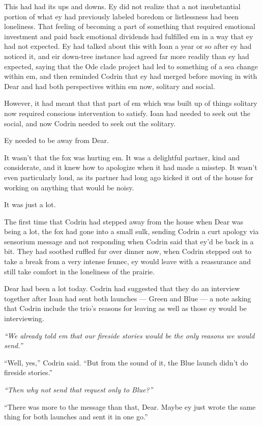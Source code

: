This had had its ups and downs. Ey did not realize that a not insubstantial portion of what ey had previously labeled boredom or listlessness had been loneliness. That feeling of becoming a part of something that required emotional investment and paid back emotional dividends had fulfilled em in a way that ey had not expected. Ey had talked about this with Ioan a year or so after ey had noticed it, and eir down-tree instance had agreed far more readily than ey had expected, saying that the Ode clade project had led to something of a sea change within em, and then reminded Codrin that ey had merged before moving in with Dear and had both perspectives within em now, solitary and social.

However, it had meant that that part of em which was built up of things solitary now required conscious intervention to satisfy. Ioan had needed to seek out the social, and now Codrin needed to seek out the solitary.

Ey needed to be away from Dear.

It wasn't that the fox was hurting em. It was a delightful partner, kind and considerate, and it knew how to apologize when it had made a misstep. It wasn't even particularly loud, as its partner had long ago kicked it out of the house for working on anything that would be noisy.

It was just a lot.

The first time that Codrin had stepped away from the house when Dear was being a lot, the fox had gone into a small sulk, sending Codrin a curt apology via sensorium message and not responding when Codrin said that ey'd be back in a bit. They had soothed ruffled fur over dinner now, when Codrin stepped out to take a break from a very intense fennec, ey would leave with a reassurance and still take comfort in the loneliness of the prairie.

Dear had been a lot today. Codrin had suggested that they do an interview together after Ioan had sent both launches — Green and Blue — a note asking that Codrin include the trio's reasons for leaving as well as those ey would be interviewing.

\emph{``We already told em that our fireside stories would be the only reasons we would send.''}

``Well, yes,'' Codrin said. ``But from the sound of it, the Blue launch didn't do fireside stories.''

\emph{``Then why not send that request only to Blue?''}

``There was more to the message than that, Dear. Maybe ey just wrote the same thing for both launches and sent it in one go.''

